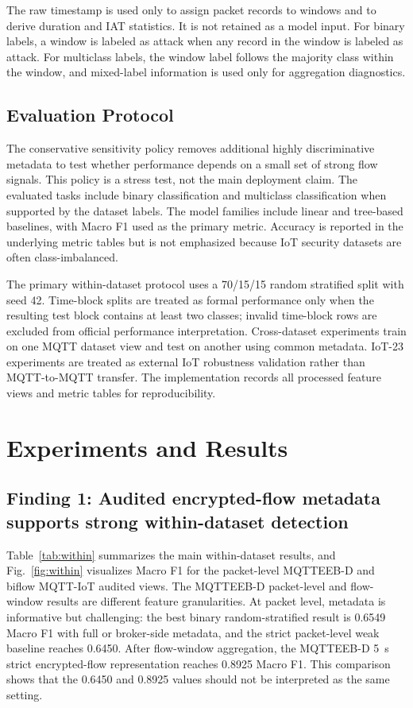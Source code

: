 \documentclass[lettersize,journal]{IEEEtran}
\begin{document}
The raw timestamp is used only to assign packet records to windows and to derive duration and IAT statistics. It is not retained as a model input. For binary labels, a window is labeled as attack when any record in the window is labeled as attack. For multiclass labels, the window label follows the majority class within the window, and mixed-label information is used only for aggregation diagnostics.

\subsection{Evaluation Protocol}
The conservative sensitivity policy removes additional highly discriminative metadata to test whether performance depends on a small set of strong flow signals. This policy is a stress test, not the main deployment claim. The evaluated tasks include binary classification and multiclass classification when supported by the dataset labels. The model families include linear and tree-based baselines, with Macro F1 used as the primary metric. Accuracy is reported in the underlying metric tables but is not emphasized because IoT security datasets are often class-imbalanced.

The primary within-dataset protocol uses a 70/15/15 random stratified split with seed 42. Time-block splits are treated as formal performance only when the resulting test block contains at least two classes; invalid time-block rows are excluded from official performance interpretation. Cross-dataset experiments train on one MQTT dataset view and test on another using common metadata. IoT-23 experiments are treated as external IoT robustness validation rather than MQTT-to-MQTT transfer. The implementation records all processed feature views and metric tables for reproducibility.

\section{Experiments and Results}
\label{sec:results}
\subsection{Finding 1: Audited encrypted-flow metadata supports strong within-dataset detection}
Table~\ref{tab:within} summarizes the main within-dataset results, and Fig.~\ref{fig:within} visualizes Macro F1 for the packet-level MQTTEEB-D and biflow MQTT-IoT audited views. The MQTTEEB-D packet-level and flow-window results are different feature granularities. At packet level, metadata is informative but challenging: the best binary random-stratified result is 0.6549 Macro F1 with full or broker-side metadata, and the strict packet-level weak baseline reaches 0.6450. After flow-window aggregation, the MQTTEEB-D 5~s strict encrypted-flow representation reaches 0.8925 Macro F1. This comparison shows that the 0.6450 and 0.8925 values should not be interpreted as the same setting.
\end{document}
